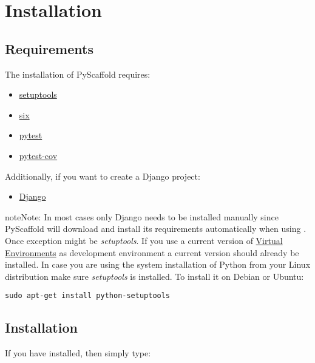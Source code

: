 \documentclass[letterpaper,10pt,english]{sphinxmanual}
\begin{document}
\section{Installation}
\label{install:installation}\label{install::doc}

\subsection{Requirements}
\label{install:requirements}
The installation of PyScaffold requires:
\begin{itemize}
\item {} 
\href{https://pypi.python.org/pypi/setuptools/}{setuptools}

\item {} 
\href{https://pypi.python.org/pypi/six}{six}

\item {} 
\href{https://pypi.python.org/pypi/pytest/}{pytest}

\item {} 
\href{https://pypi.python.org/pypi/pytest-cov/}{pytest-cov}

\end{itemize}

Additionally, if you want to create a Django project:
\begin{itemize}
\item {} 
\href{https://pypi.python.org/pypi/Django/}{Django}

\end{itemize}

\begin{notice}{note}{Note:}
In most cases only Django needs to be installed manually since PyScaffold
will download and install its requirements automatically when using
. Once exception might be \emph{setuptools}. If you use a current version
of \href{http://docs.python-guide.org/en/latest/dev/virtualenvs/}{Virtual Environments} as development environment a current version should already
be installed. In case you are using the system installation of Python
from your Linux distribution make sure \emph{setuptools} is installed.
To install it on Debian or Ubuntu:

\begin{Verbatim}[commandchars=\\\{\}]
sudo apt-get install python-setuptools
\end{Verbatim}
\end{notice}


\subsection{Installation}
\label{install:id1}
If you have  installed, then simply type:
\end{document}
